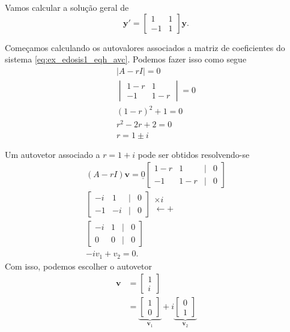 \begin{ex}
  Vamos calcular a solução geral de
  \begin{equation}\label{eq:ex_edosis1_eqh_avc}
    \pmb{y}' =
    \begin{bmatrix}
      1 & 1 \\
      -1 & 1
    \end{bmatrix}\pmb{y}.
  \end{equation}

  Começamos calculando os autovalores associados a matriz de coeficientes do sistema \eqref{eq:ex_edosis1_eqh_avc}. Podemos fazer isso como segue
  \begin{gather}
    |A-rI| = 0 \\
    \begin{vmatrix}
      1-r & 1 \\
      -1 & 1-r
    \end{vmatrix} = 0 \\
    (1-r)^2 + 1 = 0 \\
    r^2 - 2r + 2 = 0 \\
    r = 1\pm i
  \end{gather}

  Um autovetor associado a $r = 1 + i$ pode ser obtidos resolvendo-se
  \begin{gather}
    (A-rI)\pmb{v} = \underline{0}
    \begin{bmatrix}
      1-r & 1 & | & 0 \\
      -1 & 1-r & | & 0
    \end{bmatrix} \\
    \begin{bmatrix}
      -i &  1 & | & 0 \\
      -1 & -i & | & 0
    \end{bmatrix}
    \begin{matrix}
      \times i \\
      \leftarrow +
    \end{matrix}\\
    \begin{bmatrix}
      -i & 1 & | & 0 \\
      0 & 0 & | & 0
    \end{bmatrix} \\
    -iv_1 + v_2 = 0.
  \end{gather}
  Com isso, podemos escolher o autovetor
  \begin{align}
    \pmb{v} &=
              \begin{bmatrix}
                1 \\
                i
              \end{bmatrix} \\
            &=
              \underbrace{\begin{bmatrix}
                1\\
                0
              \end{bmatrix}}_{\pmb{v}_1} + i
    \underbrace{\begin{bmatrix}
      0\\
      1
    \end{bmatrix}}_{\pmb{v}_2}
  \end{align}
  

\end{ex}
